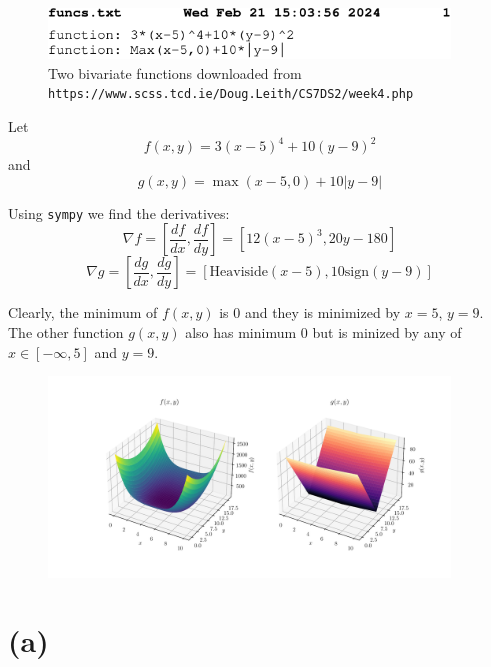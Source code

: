 

\begin{figure}
  \begin{center}
    \includegraphics[width=0.95\textwidth]{funcs.pdf}
  \end{center}
  \caption{Two bivariate functions downloaded from \texttt{https://www.scss.tcd.ie/Doug.Leith/CS7DS2/week4.php}}\label{lst:funcs.txt}
\end{figure}


Let \begin{equation}
  f(x,y)=3(x-5)^4+10(y-9)^2
  \label{eq:f}
\end{equation}
and 
\begin{equation}
  g(x,y)=\max(x-5,0)+10|y-9|
  \label{eq:g}
\end{equation}

Using \texttt{sympy} we find the derivatives:
$$\nabla f=[\frac{df}{dx},\frac{df}{dy}]=[12(x-5)^{3},20y-180]$$
$$\nabla g=[\frac{dg}{dx},\frac{dg}{dy}]=[\text{Heaviside}(x-5),10\text{sign}(y-9)]$$


Clearly, the minimum of $f(x,y)$ is $0$ and they is minimized by $x=5$, $y=9$.
The other function $g(x,y)$ also has minimum $0$ but is minized by any of $x\in[-\infty,5]$ and $y=9$.


\begin{figure}
  \begin{center}
    \includegraphics[width=0.95\textwidth]{fig/f-g.pdf}
  \end{center}
  \caption{}\label{fig:f-and-g}
\end{figure}

\section{(a)}
